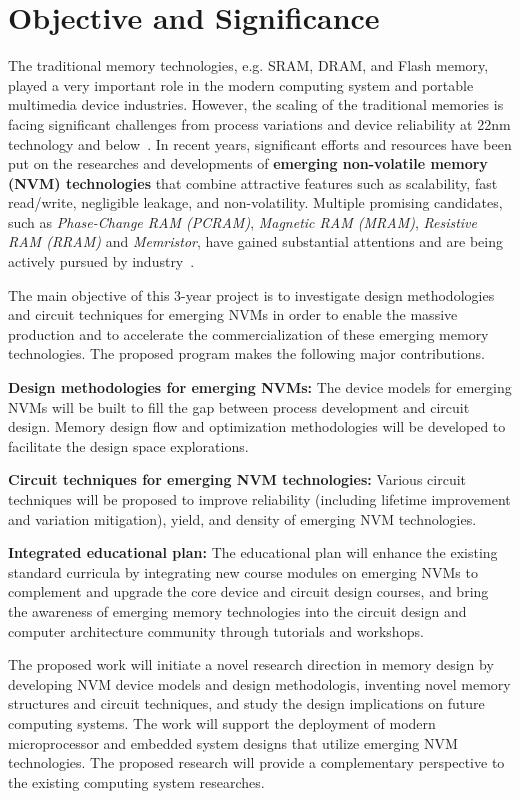 \section{Objective and Significance}

The traditional memory technologies, e.g. SRAM, DRAM, and Flash memory, played a very important role in the modern computing system and portable multimedia device industries. However, the scaling of the traditional memories is facing significant challenges from process variations and device reliability at 22nm technology and below~\cite{ITRS07,Kinam07}.
In recent years, significant efforts and resources have been put on the researches and developments of \textbf{emerging non-volatile memory (NVM) technologies} that combine attractive features such as scalability, fast read/write, negligible leakage, and non-volatility. Multiple promising candidates, such as \emph{Phase-Change RAM (PCRAM)}, \emph{Magnetic RAM (MRAM)}, \emph{Resistive RAM (RRAM)} and \emph{Memristor}, have gained substantial attentions and are being actively pursued by industry~\cite{ITRS07,burr:scm08}.

The main objective of this 3-year project is to investigate design methodologies and circuit techniques for emerging NVMs in order to enable the massive production and to accelerate the commercialization of these emerging memory technologies. The proposed program makes the following major contributions.

\vspace{5pt}
\squishlist
\item {\textbf{Design methodologies for emerging NVMs:} The device models for emerging NVMs will be built to fill the gap between process development and circuit design. Memory design flow and optimization methodologies will be developed to facilitate the design space explorations.}
\item {\textbf{Circuit techniques for emerging NVM technologies:} Various circuit techniques will be proposed to improve reliability (including lifetime improvement and variation mitigation), yield, and density of emerging NVM technologies.}
\item {\textbf{Integrated educational plan:} The educational plan will enhance the existing standard curricula by integrating new course modules on emerging NVMs to complement and upgrade the core device and circuit design courses, and bring the awareness of emerging memory technologies into the circuit design and computer architecture community through tutorials and workshops.}
\squishend
\vspace{5pt}

The proposed work will initiate a novel research direction in memory design by developing NVM device models and design methodologis, inventing novel memory structures and circuit techniques, and study the design implications on future computing systems. The work will support the deployment of modern microprocessor and embedded system designs that utilize emerging NVM technologies. The proposed research will provide a complementary perspective to the existing computing system researches.


